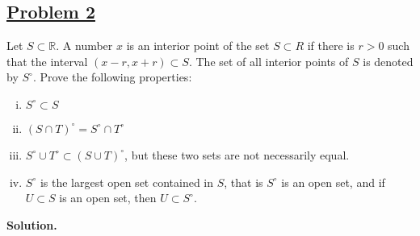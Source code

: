 \documentclass[10pt,letterpaper]{article}
\begin{document}
	\subsection*{{\color{purple}\underline{Problem 2}}}
	Let $S \subset \mathbb{R}$. A number $x$ is an interior point of the set $S \subset R$ if there is $r > 0$
	such that the interval $(x - r, x + r) \subset S$. The set of all interior points of $S$ is denoted by $S^{\circ}$.
	Prove the following properties:
	\begin{enumerate}[(i)]
		\item $S^{\circ} \subset S$
		\item $(S \cap T)^{\circ} = S^{\circ} \cap T^{\circ}$	
		\item $S^{\circ} \cup T^{\circ} \subset (S \cup T)^{\circ}$, but these two sets are not necessarily equal.
		\item $S^{\circ}$ is the largest open set contained in $S$, that is $S^{\circ}$ is an open set, and if
		$U \subset S$ is an open set, then $U \subset S^{\circ}$.
	\end{enumerate}
	\textbf{Solution. }
\end{document}
